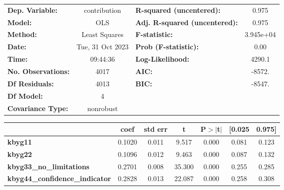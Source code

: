 \begin{center}
\begin{tabular}{lclc}
\toprule
\textbf{Dep. Variable:}                &   contribution   & \textbf{  R-squared (uncentered):}      &     0.975   \\
\textbf{Model:}                        &       OLS        & \textbf{  Adj. R-squared (uncentered):} &     0.975   \\
\textbf{Method:}                       &  Least Squares   & \textbf{  F-statistic:       }          & 3.945e+04   \\
\textbf{Date:}                         & Tue, 31 Oct 2023 & \textbf{  Prob (F-statistic):}          &     0.00    \\
\textbf{Time:}                         &     09:44:36     & \textbf{  Log-Likelihood:    }          &    4290.1   \\
\textbf{No. Observations:}             &        4017      & \textbf{  AIC:               }          &    -8572.   \\
\textbf{Df Residuals:}                 &        4013      & \textbf{  BIC:               }          &    -8547.   \\
\textbf{Df Model:}                     &           4      & \textbf{                     }          &             \\
\textbf{Covariance Type:}              &    nonrobust     & \textbf{                     }          &             \\
\bottomrule
\end{tabular}
\begin{tabular}{lcccccc}
                                       & \textbf{coef} & \textbf{std err} & \textbf{t} & \textbf{P$> |$t$|$} & \textbf{[0.025} & \textbf{0.975]}  \\
\midrule
\textbf{kbyg11}                        &       0.1020  &        0.011     &     9.517  &         0.000        &        0.081    &        0.123     \\
\textbf{kbyg22}                        &       0.1096  &        0.012     &     9.463  &         0.000        &        0.087    &        0.132     \\
\textbf{kbyg33\_no\_limitations}       &       0.2701  &        0.008     &    35.300  &         0.000        &        0.255    &        0.285     \\
\textbf{kbyg44\_confidence\_indicator} &       0.2828  &        0.013     &    22.087  &         0.000        &        0.258    &        0.308     \\

\end{tabular}
\end{center}

